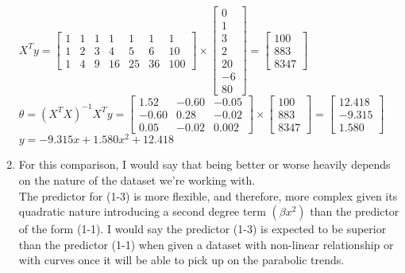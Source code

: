 \documentclass{assignment}
\begin{document}
\begin{problem}
\begin{enumerate}[label=\alph*)]
    $X^Ty = \begin{bmatrix}
        1&1&1&1&1&1&1\\
        1&2&3&4&5&6&10\\
        1&4&9&16&25&36&100
    \end{bmatrix} \times \begin{bmatrix}
        0\\1\\3\\2\\20\\-6\\80
    \end{bmatrix} = \begin{bmatrix}
        100\\883\\8347
    \end{bmatrix}$\\

    $\theta = (X^TX)^{-1} X^Ty = \begin{bmatrix}
        1.52&-0.60&-0.05\\
        -0.60&0.28&-0.02\\
        0.05&-0.02&0.002
    \end{bmatrix} \times \begin{bmatrix}
        100\\883\\8347
    \end{bmatrix} = \begin{bmatrix}
        12.418\\-9.315\\1.580
    \end{bmatrix}$\\
    
    $y = -9.315x + 1.580x^2 + 12.418$\\

    \item
    For this comparison, I would say that being better or worse heavily depends on the nature of the dataset we're working with.\\

    The predictor for (1-3) is more flexible, and therefore, more complex given its quadratic nature introducing a second degree term $(\beta x^2)$ than the predictor of the form (1-1). I would say the predictor (1-3) is expected to be superior than the predictor (1-1) when given a dataset with non-linear relationship or with curves once it will be able to pick up on the parabolic trends.\\


\end{enumerate}
\end{problem}
\end{document}

